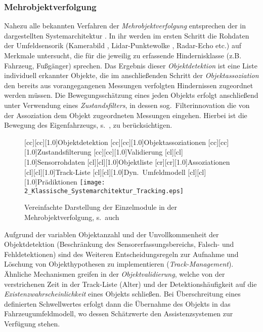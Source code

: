 \subsubsection{Mehrobjektverfolgung}
Nahezu alle bekannten Verfahren der \emph{Mehrobjektverfolgung} entsprechen der in  dargestellten Systemarchitektur \cite{mahlisch2009filtersynthese}. In ihr werden im ersten Schritt die Rohdaten der Umfeldsensorik (Kamerabild \cite{dang2007kontinuierliche}, Lidar-Punktewolke \cite{moosmann2012interlacing}, Radar-Echo \cite{Diewald2013} etc.) auf Merkmale untersucht, die für die jeweilig zu erfassende Hindernisklasse (z.B. Fahrzeug, Fußgänger) sprechen. Das Ergebnis dieser \emph{Objektdetektion} ist eine Liste individuell erkannter Objekte, die im anschließenden Schritt der \emph{Objektassoziation} den bereits aus vorangegangenen Messungen verfolgten Hindernissen zugeordnet werden müssen.
Die Bewegungsschätzung eines jeden Objekts erfolgt anschließend unter Verwendung eines \emph{Zustandsfilters}, in dessen sog.\ Filterinnovation die von der Assoziation dem Objekt zugeordneten Messungen eingehen. Hierbei ist die Bewegung des Eigenfahrzeugs, s.\ , zu berücksichtigen.
\begin{figure}[h]
\newcommand{\smallsize}{.5}
	[cc][cc][1.0]{Objektdetektion}
	[cc][cc][1.0]{Objektassoziationen}
	[cc][cc][1.0]{Zustandsfilterung}
	[cc][cc][1.0]{Validierung}
	[cl][cl][1.0]{Sensorrohdaten}
	[cl][cl][1.0]{Objektliste}
	[cr][cr][1.0]{Assoziationen}
	[cl][cl][1.0]{Track-Liste}
	[cl][cl][1.0]{Dyn.\ Umfeldmodell}
	[cl][cl][1.0]{Prädiktionen}
	\centering
\texttt{[image: 2\_Klassische\_Systemarchitektur\_Tracking.eps]}
 \caption[Einzelmodule in der Mehrobjektverfolgung]{Vereinfachte Darstellung der Einzelmodule in der Mehrobjektverfolgung, s.\ auch \cite{mahlisch2009filtersynthese}}
 \label{fig:Klassische_Systemarchitektur_Tracking}
\end{figure}

Aufgrund der variablen Objektanzahl und der Unvollkommenheit der Objektdetektion (Beschränkung des Sensorerfassungsbereichs, Falsch- und Fehldetektionen) sind des Weiteren Entscheidungsregeln zur Aufnahme und Löschung von Objekthypothesen zu implementieren (\emph{Track-Management}). Ähnliche Mechanismen greifen in der \emph{Objektvalidierung}, welche \ua von der verstrichenen Zeit in der Track-Liste (Alter) und der Detektionshäufigkeit auf die \emph{Existenzwahrscheinlichkeit} eines Objekts schließen. Bei Überschreitung eines definierten Schwellwertes erfolgt dann die Übernahme des Objekts in das Fahrzeugumfeldmodell, wo dessen Schätzwerte den Assistenzsystemen zur Verfügung stehen.


